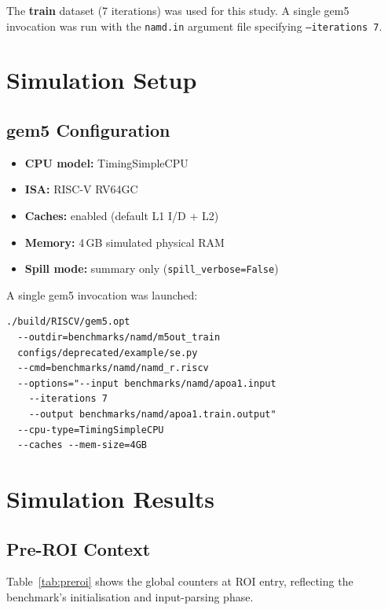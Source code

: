 \documentclass[conference]{IEEEtran}
\begin{document}
The \textbf{train} dataset (7 iterations) was used for this study.
A single gem5 invocation was run with the \texttt{namd.in} argument
file specifying \texttt{--iterations 7}.

\section{Simulation Setup}

\subsection{gem5 Configuration}

\begin{itemize}
    \item \textbf{CPU model:}   TimingSimpleCPU
    \item \textbf{ISA:}         RISC-V RV64GC
    \item \textbf{Caches:}      enabled (default L1 I/D + L2)
    \item \textbf{Memory:}      4\,GB simulated physical RAM
    \item \textbf{Spill mode:}  summary only (\texttt{spill\_verbose=False})
\end{itemize}

A single gem5 invocation was launched:

\begin{verbatim}
./build/RISCV/gem5.opt
  --outdir=benchmarks/namd/m5out_train
  configs/deprecated/example/se.py
  --cmd=benchmarks/namd/namd_r.riscv
  --options="--input benchmarks/namd/apoa1.input
    --iterations 7
    --output benchmarks/namd/apoa1.train.output"
  --cpu-type=TimingSimpleCPU
  --caches --mem-size=4GB
\end{verbatim}

\section{Simulation Results}

\subsection{Pre-ROI Context}

Table~\ref{tab:preroi} shows the global counters at ROI entry,
reflecting the benchmark's initialisation and input-parsing phase.
\end{document}
